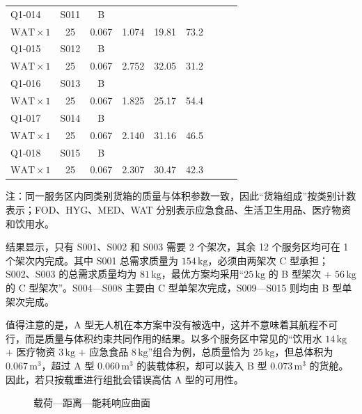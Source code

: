 \documentclass[bwprint,fontset=fandol]{gmcmthesis}
\begin{document}
\begin{longtable}{@{}lcclrrrrr@{}}
    Q1-014 & S011 & B & \shortstack[l]{\strut $\mathrm{FOD}\times 1$\quad $\mathrm{MED}\times 1$\\\strut $\mathrm{WAT}\times 1$} & 25 & 0.067 & 1.074 & 19.81 & 73.2 \\[3pt]
    Q1-015 & S012 & B & \shortstack[l]{\strut $\mathrm{FOD}\times 1$\quad $\mathrm{MED}\times 1$\\\strut $\mathrm{WAT}\times 1$} & 25 & 0.067 & 2.752 & 32.05 & 31.2 \\[3pt]
    Q1-016 & S013 & B & \shortstack[l]{\strut $\mathrm{FOD}\times 1$\quad $\mathrm{MED}\times 1$\\\strut $\mathrm{WAT}\times 1$} & 25 & 0.067 & 1.825 & 25.17 & 54.4 \\[3pt]
    Q1-017 & S014 & B & \shortstack[l]{\strut $\mathrm{FOD}\times 1$\quad $\mathrm{MED}\times 1$\\\strut $\mathrm{WAT}\times 1$} & 25 & 0.067 & 2.140 & 31.16 & 46.5 \\[3pt]
    Q1-018 & S015 & B & \shortstack[l]{\strut $\mathrm{FOD}\times 1$\quad $\mathrm{MED}\times 1$\\\strut $\mathrm{WAT}\times 1$} & 25 & 0.067 & 2.307 & 30.47 & 42.3 \\[3pt]
\end{longtable}
\endgroup

注：同一服务区内同类别货箱的质量与体积参数一致，因此“货箱组成”按类别计数表示；FOD、HYG、MED、WAT 分别表示应急食品、生活卫生用品、医疗物资和饮用水。

结果显示，只有 S001、S002 和 S003 需要 2 个架次，其余 12 个服务区均可在 1 个架次内完成。其中 S001 总需求质量为 $154\,\mathrm{kg}$，必须由两架次 C 型承担；S002、S003 的总需求质量均为 $81\,\mathrm{kg}$，最优方案均采用“$25\,\mathrm{kg}$ 的 B 型架次 + $56\,\mathrm{kg}$ 的 C 型架次”。S004—S008 主要由 C 型单架次完成，S009—S015 则均由 B 型单架次完成。

值得注意的是，A 型无人机在本方案中没有被选中，这并不意味着其航程不可行，而是质量与体积约束共同作用的结果。以多个服务区中常见的“饮用水 $14\,\mathrm{kg}$ + 医疗物资 $3\,\mathrm{kg}$ + 应急食品 $8\,\mathrm{kg}$”组合为例，总质量恰为 $25\,\mathrm{kg}$，但总体积为 $0.067\,\mathrm{m}^{3}$，超过 A 型 $0.060\,\mathrm{m}^{3}$ 的装载体积，却可以装入 B 型 $0.073\,\mathrm{m}^{3}$ 的货舱。因此，若只按载重进行组批会错误高估 A 型的可用性。
\begin{figure}[H]
  \centering
  \caption{载荷—距离—能耗响应曲面}
  \label{fig:q1-objective-comparison}
\end{figure}
\end{document}
